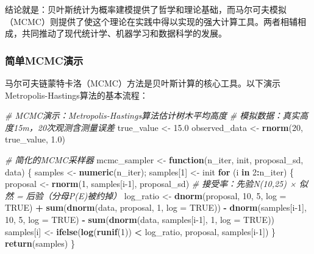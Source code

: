 \documentclass[
  twoside,12pt,fontset=none]{ctexbook}
\newenvironment{Shaded}{\begin{snugshade}}{\end{snugshade}}
\newcommand{\AttributeTok}[1]{\textcolor[rgb]{0.13,0.29,0.53}{#1}}
\newcommand{\CommentTok}[1]{\textcolor[rgb]{0.56,0.35,0.01}{\textit{#1}}}
\newcommand{\ConstantTok}[1]{\textcolor[rgb]{0.56,0.35,0.01}{#1}}
\newcommand{\ControlFlowTok}[1]{\textcolor[rgb]{0.13,0.29,0.53}{\textbf{#1}}}
\newcommand{\DecValTok}[1]{\textcolor[rgb]{0.00,0.00,0.81}{#1}}
\newcommand{\FloatTok}[1]{\textcolor[rgb]{0.00,0.00,0.81}{#1}}
\newcommand{\FunctionTok}[1]{\textcolor[rgb]{0.13,0.29,0.53}{\textbf{#1}}}
\newcommand{\NormalTok}[1]{#1}
\newcommand{\OtherTok}[1]{\textcolor[rgb]{0.56,0.35,0.01}{#1}}
\newcommand{\SpecialCharTok}[1]{\textcolor[rgb]{0.81,0.36,0.00}{\textbf{#1}}}
\begin{document}
结论就是：贝叶斯统计为概率建模提供了哲学和理论基础，而马尔可夫模拟（MCMC）则提供了使这个理论在实践中得以实现的强大计算工具。两者相辅相成，共同推动了现代统计学、机器学习和数据科学的发展。

\hypertarget{ux7b80ux5355mcmcux6f14ux793a}{%
\subsubsection{简单MCMC演示}\label{ux7b80ux5355mcmcux6f14ux793a}}

马尔可夫链蒙特卡洛（MCMC）方法是贝叶斯计算的核心工具。以下演示Metropolis-Hastings算法的基本流程：

\begin{Shaded}
\begin{Highlighting}[]
\CommentTok{\# MCMC演示：Metropolis{-}Hastings算法估计树木平均高度}
\CommentTok{\# 模拟数据：真实高度15m，20次观测含测量误差}
\NormalTok{true\_value }\OtherTok{\textless{}{-}} \FloatTok{15.0}
\NormalTok{observed\_data }\OtherTok{\textless{}{-}} \FunctionTok{rnorm}\NormalTok{(}\DecValTok{20}\NormalTok{, true\_value, }\FloatTok{1.0}\NormalTok{)}

\CommentTok{\# 简化的MCMC采样器}
\NormalTok{mcmc\_sampler }\OtherTok{\textless{}{-}} \ControlFlowTok{function}\NormalTok{(n\_iter, init, proposal\_sd, data) \{}
\NormalTok{  samples }\OtherTok{\textless{}{-}} \FunctionTok{numeric}\NormalTok{(n\_iter); samples[}\DecValTok{1}\NormalTok{] }\OtherTok{\textless{}{-}}\NormalTok{ init}
  \ControlFlowTok{for}\NormalTok{ (i }\ControlFlowTok{in} \DecValTok{2}\SpecialCharTok{:}\NormalTok{n\_iter) \{}
\NormalTok{    proposal }\OtherTok{\textless{}{-}} \FunctionTok{rnorm}\NormalTok{(}\DecValTok{1}\NormalTok{, samples[i}\DecValTok{{-}1}\NormalTok{], proposal\_sd)}
    \CommentTok{\# 接受率：先验N(10,25) × 似然 = 后验（分母P(E)被约掉）}
\NormalTok{    log\_ratio }\OtherTok{\textless{}{-}} \FunctionTok{dnorm}\NormalTok{(proposal, }\DecValTok{10}\NormalTok{, }\DecValTok{5}\NormalTok{, }\AttributeTok{log =} \ConstantTok{TRUE}\NormalTok{) }\SpecialCharTok{+}
                 \FunctionTok{sum}\NormalTok{(}\FunctionTok{dnorm}\NormalTok{(data, proposal, }\DecValTok{1}\NormalTok{, }\AttributeTok{log =} \ConstantTok{TRUE}\NormalTok{)) }\SpecialCharTok{{-}}
                 \FunctionTok{dnorm}\NormalTok{(samples[i}\DecValTok{{-}1}\NormalTok{], }\DecValTok{10}\NormalTok{, }\DecValTok{5}\NormalTok{, }\AttributeTok{log =} \ConstantTok{TRUE}\NormalTok{) }\SpecialCharTok{{-}}
                 \FunctionTok{sum}\NormalTok{(}\FunctionTok{dnorm}\NormalTok{(data, samples[i}\DecValTok{{-}1}\NormalTok{], }\DecValTok{1}\NormalTok{, }\AttributeTok{log =} \ConstantTok{TRUE}\NormalTok{))}
\NormalTok{    samples[i] }\OtherTok{\textless{}{-}} \FunctionTok{ifelse}\NormalTok{(}\FunctionTok{log}\NormalTok{(}\FunctionTok{runif}\NormalTok{(}\DecValTok{1}\NormalTok{)) }\SpecialCharTok{\textless{}}\NormalTok{ log\_ratio, proposal, samples[i}\DecValTok{{-}1}\NormalTok{])}
\NormalTok{  \}}
  \FunctionTok{return}\NormalTok{(samples)}
\NormalTok{\}}


\end{Highlighting}
\end{Shaded}
\end{document}

